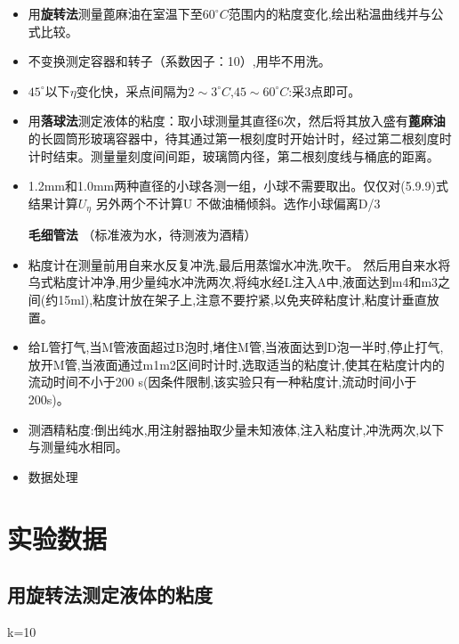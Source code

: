 \documentclass[12pt,a4paper]{ctexart}
\begin{document}
\begin{itemize}

\item
  用\textbf{旋转法}测量蓖麻油在室温下至$60^{\circ}C$范围内的粘度变化,绘出粘温曲线并与公式比较。
  \item 不变换测定容器和转子（系数因子：10）,用毕不用洗。
  \item $45^{\circ}$以下$\eta$变化快，采点间隔为$2\sim3^{\circ}C$,$45\sim60^{\circ}C$:采3点即可。
  
\item 用\textbf{落球法}测定液体的粘度：取小球测量其直径6次，然后将其放入盛有\textbf{蓖麻油}的长圆筒形玻璃容器中，待其通过第一根刻度时开始计时，经过第二根刻度时计时结束。测量量刻度间间距，玻璃筒内径，第二根刻度线与桶底的距离。
\item 1.2mm和1.0mm两种直径的小球各测一组，小球不需要取出。仅仅对(5.9.9)式结果计算$U_{\eta}$ 另外两个不计算U 不做油桶倾斜。选作小球偏离D/3

\textbf{毛细管法} （标准液为水，待测液为酒精）
\item 粘度计在测量前用自来水反复冲洗,最后用蒸馏水冲洗,吹干。
 然后用自来水将乌式粘度计冲净,用少量纯水冲洗两次,将纯水经L注入A中,液面达到m4和m3之间(约15ml),粘度计放在架子上,注意不要拧紧,以免夹碎粘度计,粘度计垂直放置。
 \item 给L管打气,当M管液面超过B泡时,堵住M管,当液面达到D泡一半时,停止打气,放开M管,当液面通过m1m2区间时计时,选取适当的粘度计,使其在粘度计内的流动时间不小于200 s(因条件限制,该实验只有一种粘度计,流动时间小于200s)。
\item 测酒精粘度:倒出纯水,用注射器抽取少量未知液体,注入粘度计,冲洗两次,以下与测量纯水相同。
  \item 数据处理
\end{itemize}

\section{实验数据}

\subsection{用旋转法测定液体的粘度}
k=10
\end{document}
